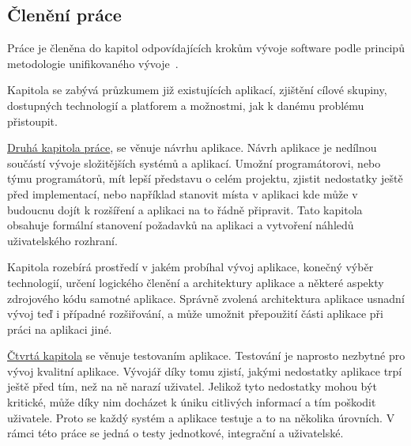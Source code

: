 \begin{introduction}
    \section{Členění práce}
    Práce je členěna do kapitol odpovídajících krokům vývoje software podle principů metodologie unifikovaného vývoje~\cite[s.~51‑68]{arlow_2007_uml}.

    Kapitola  se zabývá průzkumem již existujících aplikací, zjištění cílové skupiny, dostupných technologií a platforem a možnostmi, jak k danému problému přistoupit.

    \hyperref[ch:design]{Druhá kapitola práce}, se věnuje návrhu aplikace. Návrh aplikace je nedílnou součástí vývoje složitějších systémů a aplikací. Umožní programátorovi, nebo týmu programátorů, mít lepší představu o celém projektu, zjistit nedostatky ještě před implementací, nebo například stanovit místa v aplikaci kde může v budoucnu dojít k rozšíření a aplikaci na to řádně připravit. Tato kapitola obsahuje formální stanovení požadavků na aplikaci a vytvoření náhledů uživatelského rozhraní.

    Kapitola  rozebírá prostředí v jakém probíhal vývoj aplikace, konečný výběr technologií, určení logického členění a architektury aplikace a některé aspekty zdrojového kódu samotné aplikace. Správně zvolená architektura aplikace usnadní vývoj teď i případné rozšiřování, a může umožnit přepoužití části aplikace při práci na aplikaci jiné.

    \hyperref[ch:testing]{Čtvrtá kapitola} se věnuje testovaním aplikace. Testování je naprosto nezbytné pro vývoj kvalitní aplikace. Vývojář díky tomu zjistí, jakými nedostatky aplikace trpí ještě před tím, než na ně narazí uživatel. Jelikož tyto nedostatky mohou být kritické, může díky nim docházet k úniku citlivých informací a tím poškodit uživatele. Proto se každý systém a aplikace testuje a to na několika úrovních. V rámci této práce se jedná o testy jednotkové, integrační a uživatelské.
\end{introduction}